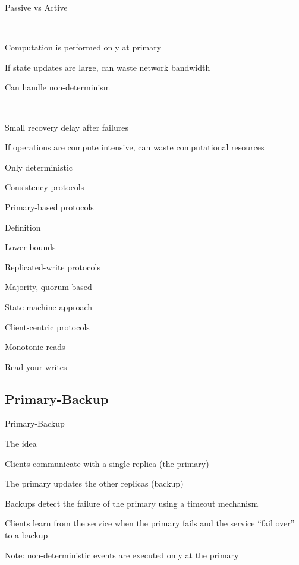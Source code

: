 \begin{frame}{Passive vs Active}

\\
\BI
\item Computation is performed only at primary
\item If state updates are large, can waste network bandwidth
\item Can handle non-determinism
\EI

\bigskip
{}\\
\BI
\item Small recovery delay after failures
\item If operations are compute intensive, can waste computational resources
\item Only deterministic
\EI

\end{frame}


\begin{frame}{Consistency protocols}

\BIL
\item Primary-based protocols
	\BI
	\item Definition
	\item Lower bounds
	\EI
\item Replicated-write protocols
	\BI
	\item Majority, quorum-based
	\item State machine approach
	\EI
\item Client-centric protocols
\BI
\item Monotonic reads
\item Read-your-writes
\EI
\EIL

\end{frame}

\subsection{Primary-Backup}

\begin{frame}{Primary-Backup}

\begin{block}{The idea}
\BIL
\item Clients communicate with a single replica (the \alert{primary})
\item The primary updates the other replicas (\alert{backup})
\item Backups detect the failure of the primary using a timeout mechanism
\item Clients learn from the service when the primary fails and the service “fail over” to a backup
\item Note: non-deterministic events are executed only at the primary
\EIL
\end{block}

\end{frame}


